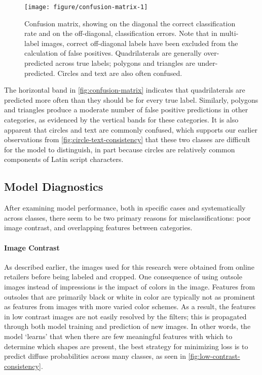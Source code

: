 \documentclass{article}\usepackage[]{graphicx}\usepackage[table]{xcolor}
\newenvironment{knitrout}{}{} %
\begin{document}
\begin{knitrout}
\color{fgcolor}\begin{figure}

{\centering \texttt{[image: figure/confusion-matrix-1]}

}

\caption[Confusion matrix, with correct and incorrect model classifications.]{Confusion matrix, showing on the diagonal the correct classification rate and on the off-diagonal, classification errors. Note that in multi-label images, correct off-diagonal labels have been excluded from the calculation of false positives. Quadrilaterals are generally over-predicted across true labels; polygons and triangles are under-predicted. Circles and text are also often confused.}\label{fig:confusion-matrix}
\end{figure}


\end{knitrout}

The horizontal band in \autoref{fig:confusion-matrix} indicates that quadrilaterals are predicted more often than they should be for every true label. Similarly, polygons and triangles produce a moderate number of false positive predictions in other categories, as evidenced by the vertical bands for these categories. It is also apparent that circles and text are commonly confused, which supports our earlier observations from \autoref{fig:circle-text-consistency} that these two classes are difficult for the model to distinguish, in part because circles are relatively common components of Latin script characters.

\subsection{Model Diagnostics}
After examining model performance, both in specific cases and systematically across classes, there seem to be two primary reasons for misclassifications: poor image contrast, and overlapping features between categories.

\paragraph{Image Contrast}
As described earlier, the images used for this research were obtained from online retailers before being labeled and cropped. One consequence of using outsole images instead of impressions is the impact of colors in the image. Features from outsoles that are primarily black or white in color are typically not as prominent as features from images with more varied color schemes. As a result, the features in low contrast images are not easily resolved by the filters; this is propagated through both model training and prediction of new images. In other words, the model `learns' that when there are few meaningful features with which to determine which shapes are present, the best strategy for minimizing loss is to predict diffuse probabilities across many classes, as seen in \autoref{fig:low-contrast-consistency}.
\end{document}
